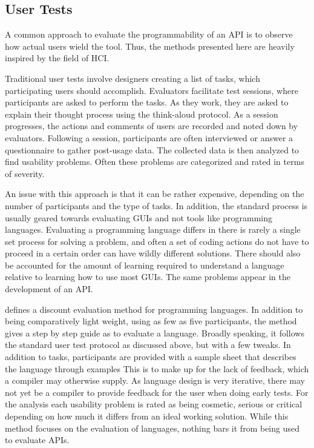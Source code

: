 \subsection{User Tests}
A common approach to evaluate the programmability of an \gls{API} is to observe how actual users wield the tool.
Thus, the methods presented here are heavily inspired by the field of \gls{HCI}.

Traditional user tests involve designers creating a list of tasks, which participating users should accomplish.
Evaluators facilitate test sessions, where participants are asked to perform the tasks.
As they work, they are asked to explain their thought process using the think-aloud protocol.
As a session progresses, the actions and comments of users are recorded and noted down by evaluators.
Following a session, participants are often interviewed or answer a questionnaire to gather post-usage data.
The collected data is then analyzed to find usability problems.
Often these problems are categorized and rated in terms of severity.

An issue with this approach is that it can be rather expensive, depending on the number of participants and the type of tasks.
In addition, the standard process is usually geared towards evaluating \glspl{GUI} and not tools like programming languages.
Evaluating a programming language differs in there is rarely a single set process for solving a problem, and often a set of coding actions do not have to proceed in a certain order  can have wildly different solutions\cite{beaton2008usability}.
There should also be accounted for the amount of learning required to understand a language relative to learning how to use most \glspl{GUI}.
The same problems appear in the development of an \gls{API}.

\citet{kurtev2016discount} defines a discount evaluation method for programming languages.
In addition to being comparatively light weight, using as few as five participants, the method gives a step by step guide as to evaluate a language.
Broadly speaking, it follows the standard user test protocol as discussed above, but with a few tweaks.
In addition to tasks, participants are provided with a sample sheet that describes the language through examples
This is to make up for the lack of feedback, which a compiler may otherwise supply.
As language design is very iterative, there may not yet be a compiler to provide feedback for the user when doing early tests.
For the analysis each usability problem is rated as being cosmetic, serious or critical depending on how much it differs from an ideal working solution.
While this method focuses on the evaluation of languages, nothing bars it from being used to evaluate \glspl{API}.

